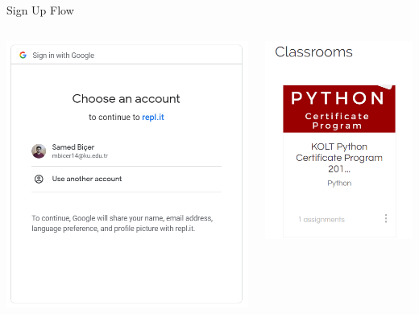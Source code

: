 \begin{frame}{Sign Up Flow}
\begin{columns}
\begin{column}{0.33\textwidth}
				\includegraphics[width=\textwidth]{images/replit_gauth2.png}
			\end{column}
			\pause
			\begin{column}{0.33\textwidth}
				\centering
				\includegraphics[width=\textwidth]{images/replit_success.png}

\end{column}
\end{columns}
\end{frame}
